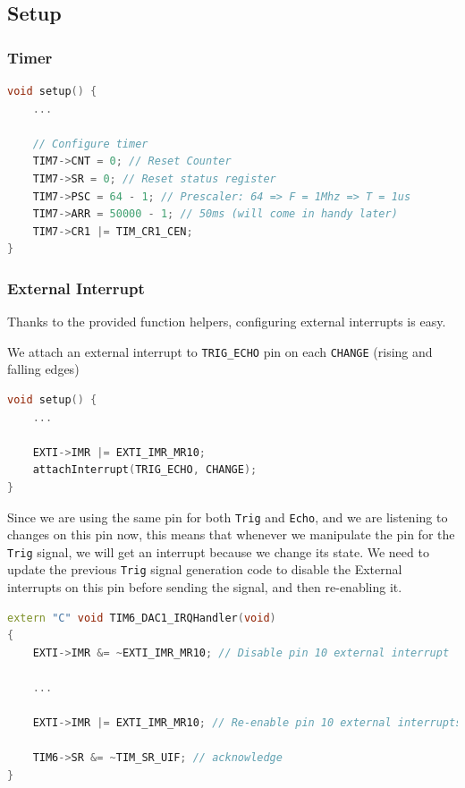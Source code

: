 \documentclass{article}
\begin{document}
\subsection{Setup}

\subsubsection{Timer}

\begin{lstlisting}[language=C++, caption={TIM7 Config}]
void setup() {
    ...

    // Configure timer
    TIM7->CNT = 0; // Reset Counter
    TIM7->SR = 0; // Reset status register
    TIM7->PSC = 64 - 1; // Prescaler: 64 => F = 1Mhz => T = 1us
    TIM7->ARR = 50000 - 1; // 50ms (will come in handy later)
    TIM7->CR1 |= TIM_CR1_CEN;
}
\end{lstlisting}

\subsubsection{External Interrupt}

Thanks to the provided function helpers, configuring external interrupts is easy.

We attach an external interrupt to \verb|TRIG_ECHO| pin on each \verb|CHANGE| (rising and falling edges)

\begin{lstlisting}[language=C++, caption={Echo interrupt setup}]
void setup() {
    ...

    EXTI->IMR |= EXTI_IMR_MR10;
    attachInterrupt(TRIG_ECHO, CHANGE);
}
\end{lstlisting}

Since we are using the same pin for both \verb|Trig| and \verb|Echo|, and we are listening to changes on this pin now, this means that whenever we manipulate the pin for the \verb|Trig| signal, we will get an interrupt because we change its state. We need to update the previous \verb|Trig| signal generation code to disable the External interrupts on this pin before sending the signal, and then re-enabling it.

\begin{lstlisting}[language=C++, caption={TIM6 Interrupt handler --- Updated}]
extern "C" void TIM6_DAC1_IRQHandler(void)
{
    EXTI->IMR &= ~EXTI_IMR_MR10; // Disable pin 10 external interrupt

    ...
    
    EXTI->IMR |= EXTI_IMR_MR10; // Re-enable pin 10 external interrupts

    TIM6->SR &= ~TIM_SR_UIF; // acknowledge
}   
\end{lstlisting}
\end{document}
